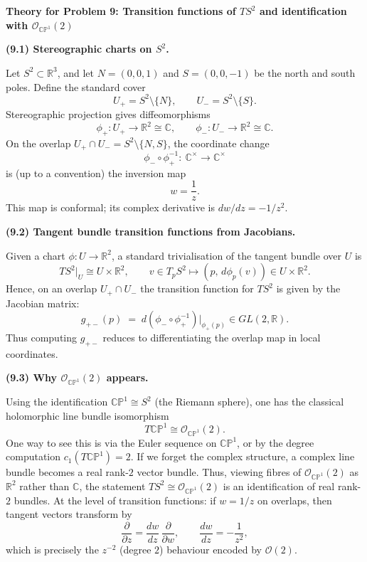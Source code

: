 \begin{solution}
\par\medskip\noindent\textbf{Theory for Problem 9: Transition functions of $TS^2$ and identification with $\mathcal{O}_{\mathbb{CP}^1}(2)$}\par\smallskip


\par\medskip\noindent\textbf{(9.1) Stereographic charts on $S^2$.}\par\smallskip

Let $S^2\subset \mathbb{R}^3$, and let $N=(0,0,1)$ and $S=(0,0,-1)$ be the north and south poles.
Define the standard cover
\[
U_+ = S^2\setminus\{N\},\qquad U_- = S^2\setminus\{S\}.
\]
Stereographic projection gives diffeomorphisms
\[
\phi_+:U_+\to \mathbb{R}^2 \cong \mathbb{C},\qquad
\phi_-:U_-\to \mathbb{R}^2 \cong \mathbb{C}.
\]
On the overlap $U_+\cap U_- = S^2\setminus\{N,S\}$, the coordinate change
\[
\phi_- \circ \phi_+^{-1}:\ \mathbb{C}^\times \longrightarrow \mathbb{C}^\times
\]
is (up to a convention) the inversion map
\[
w = \frac{1}{z}.
\]
This map is conformal; its complex derivative is $dw/dz = -1/z^2$.

\par\medskip\noindent\textbf{(9.2) Tangent bundle transition functions from Jacobians.}\par\smallskip

Given a chart $\phi:U\to \mathbb{R}^2$, a standard trivialisation of the tangent bundle over $U$ is
\[
TS^2|_U \cong U\times \mathbb{R}^2,\qquad
v\in T_pS^2 \mapsto (p,\, d\phi_p(v))\in U\times \mathbb{R}^2.
\]
Hence, on an overlap $U_+\cap U_-$ the transition function for $TS^2$ is given by the Jacobian matrix:
\[
g_{+-}(p)\;=\; d(\phi_- \circ \phi_+^{-1})\big|_{\phi_+(p)} \in GL(2,\mathbb{R}).
\]
Thus computing $g_{+-}$ reduces to differentiating the overlap map in local coordinates.

\par\medskip\noindent\textbf{(9.3) Why $\mathcal{O}_{\mathbb{CP}^1}(2)$ appears.}\par\smallskip

Using the identification $\mathbb{CP}^1\cong S^2$ (the Riemann sphere), one has the classical
holomorphic line bundle isomorphism
\[
T\mathbb{CP}^1 \cong \mathcal{O}_{\mathbb{CP}^1}(2).
\]
One way to see this is via the Euler sequence on $\mathbb{CP}^1$, or by the degree computation
$c_1(T\mathbb{CP}^1)=2$.
If we forget the complex structure, a complex line bundle becomes a real rank-$2$ vector bundle.
Thus, viewing fibres of $\mathcal{O}_{\mathbb{CP}^1}(2)$ as $\mathbb{R}^2$ rather than $\mathbb{C}$,
the statement $TS^2 \cong \mathcal{O}_{\mathbb{CP}^1}(2)$ is an identification of real rank-$2$ bundles.
At the level of transition functions: if $w=1/z$ on overlaps, then tangent vectors transform by
\[
\frac{\partial}{\partial z} = \frac{dw}{dz}\,\frac{\partial}{\partial w},\qquad \frac{dw}{dz}=-\frac{1}{z^2},
\]
which is precisely the $z^{-2}$ (degree $2$) behaviour encoded by $\mathcal{O}(2)$.



\end{solution}

